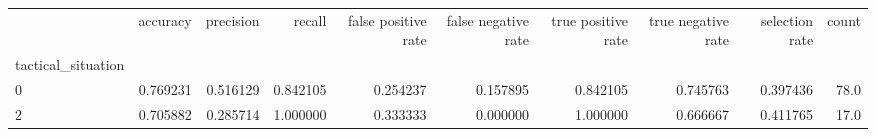 \begin{tabular}{lrrrrrrrrr}
\toprule
{} &  accuracy &  precision &    recall &  false positive rate &  false negative rate &  true positive rate &  true negative rate &  selection rate &  count \\
tactical\_situation &           &            &           &                      &                      &                     &                     &                 &        \\
\midrule
0                  &  0.769231 &   0.516129 &  0.842105 &             0.254237 &             0.157895 &            0.842105 &            0.745763 &        0.397436 &   78.0 \\
2                  &  0.705882 &   0.285714 &  1.000000 &             0.333333 &             0.000000 &            1.000000 &            0.666667 &        0.411765 &   17.0 \\
\bottomrule
\end{tabular}
